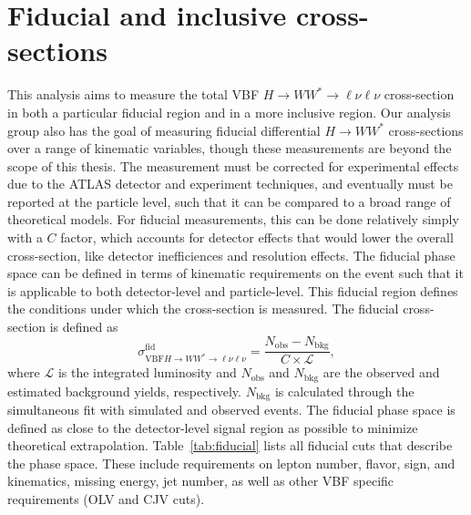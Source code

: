 \section{Fiducial and inclusive cross-sections}
This analysis aims to measure the total VBF $H\rightarrow WW^*\rightarrow\ell\nu\ell\nu$ cross-section in both a particular fiducial region and in a more inclusive region. Our analysis group also has the goal of measuring fiducial differential $H\rightarrow WW^*$ cross-sections over a range of kinematic variables, though these measurements are beyond the scope of this thesis. The measurement must be corrected for experimental effects due to the ATLAS detector and experiment techniques, and eventually must be reported at the particle level, such that it can be compared to a broad range of theoretical models. For fiducial measurements, this can be done relatively simply with a $C$ factor, which accounts for  detector effects that would lower the overall cross-section, like detector inefficiences and resolution effects. The fiducial phase space can be defined in terms of kinematic requirements on the event such that it is applicable to both detector-level and particle-level. This fiducial region defines the conditions under which the cross-section is measured. The fiducial cross-section is defined as
\begin{equation}
\sigma_{\text{VBF}H\rightarrow WW^*\rightarrow\ell\nu\ell\nu}^{\text{fid}} = \frac{N_{\text{obs}}-N_{\text{bkg}}}{C\times\mathcal{L}},
\end{equation} 
where $\mathcal{L}$ is the integrated luminosity and $N_{\text{obs}}$ and $N_{\text{bkg}}$ are the observed and estimated background yields, respectively. $N_{\text{bkg}}$ is calculated through the simultaneous fit with simulated and observed events. The fiducial phase space is defined as close to the detector-level signal region as possible to minimize theoretical extrapolation. Table~\ref{tab:fiducial} lists all fiducial cuts that describe the phase space. These include requirements on lepton number, flavor, sign, and kinematics, missing energy, jet number, as well as other VBF specific requirements (OLV and CJV cuts). 
